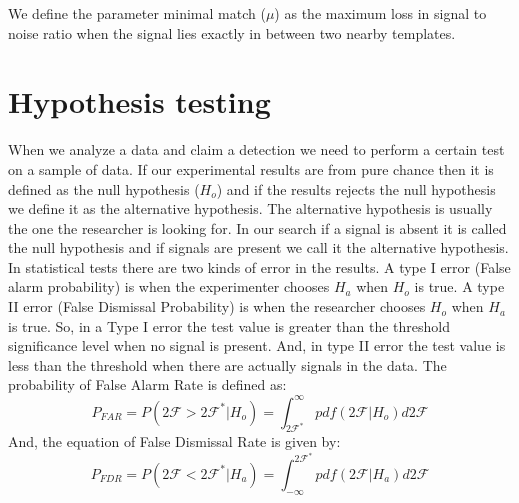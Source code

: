 \documentclass{ttuthes2007}
\begin{document}
We define the parameter minimal match ($\mu$) as the maximum loss in signal to
noise ratio when the signal lies exactly in between two nearby templates. 
\section{Hypothesis testing}                                                    
        When we analyze a data and claim a detection we need to perform a certain
test on a sample of data. If our experimental results are from pure chance then
it is defined as the null hypothesis ($H_o$) and if the results rejects the null
hypothesis we define it as the alternative hypothesis. The alternative
hypothesis is
usually the one the researcher is looking for.  In our search if a signal is absent it is
called the null hypothesis and if signals are present we call it the alternative
hypothesis.
	In statistical tests there are two kinds of error in the
results. A type I error (False alarm probability) is when the experimenter
chooses $H_a$ when $H_o$ is true. A type II error (False Dismissal
Probability) is when the researcher chooses $H_o$ when $H_a$ is true.  So, in
a Type I error the test value is greater than the threshold significance level
when no signal is present. And, in type II error the test value is less than
the threshold when there are actually signals in the data.
The probability of False Alarm Rate is defined as:
\begin{equation}
P_{FAR}=P(2\mathcal{F}>2\mathcal{F}^*|H_o)=\int_{2\mathcal{F}^*}^\infty
pdf(2\mathcal{F}|H_o)d2\mathcal{F}
\end{equation}
And, the equation of False Dismissal Rate is given by:
\begin{equation}
P_{FDR}=P(2\mathcal{F}<2\mathcal{F}^*|H_a)=\int_{-\infty}^{2\mathcal{F}^*}
pdf(2\mathcal{F}|H_a)d2\mathcal{F}
\end{equation}
\end{document}
